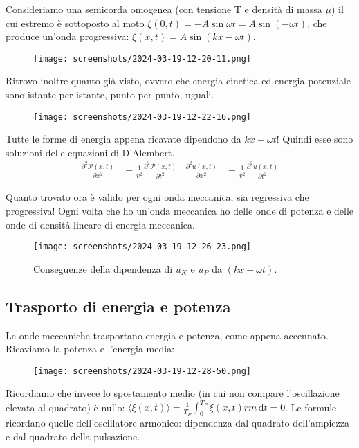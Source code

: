 \begin{eg}
	Consideriamo una semicorda omogenea (con tensione T e densità di massa \(\mu \)) il cui estremo è sottoposto al moto \(\xi (0,t) = -A \sin \omega t = A \sin (-\omega t)\), che produce un'onda progressiva: \(\xi (x,t) = A \sin (kx - \omega t)\).
	\begin{figure}[H]
		\centering
		\texttt{[image: screenshots/2024-03-19-12-20-11.png]}
	\end{figure}
	Ritrovo inoltre quanto già visto, ovvero che energia cinetica ed energia potenziale sono istante per istante, punto per punto, uguali.
	\begin{figure}[H]
		\centering
		\texttt{[image: screenshots/2024-03-19-12-22-16.png]}
	\end{figure}
	Tutte le forme di energia appena ricavate dipendono da \(kx-\omega t\)! Quindi esse sono soluzioni delle equazioni di D'Alembert.
	\begin{align}
		\frac{\partial ^{2} \mathcal{P} (x,t)}{\partial x^{2} } &= \frac{1}{v^{2} }\frac{\partial ^{2} \mathcal{P} (x,t)}{\partial t^{2} }
		&
		\frac{\partial ^{2} u (x,t)}{\partial x^{2} } &= \frac{1}{v^{2} }\frac{\partial ^{2} u(x,t)}{\partial t^{2} }  
	\end{align}
\end{eg}
Quanto trovato ora è valido per ogni onda meccanica, sia regressiva che progressiva! Ogni volta che ho un'onda meccanica ho delle onde di potenza e delle onde di densità lineare di energia meccanica.
\begin{figure}[H]
	\centering
	\texttt{[image: screenshots/2024-03-19-12-26-23.png]}
	\caption{Conseguenze della dipendenza di \(u_K\) e \(u_P\) da \((kx-\omega t)\).}
\end{figure}

\subsection{Trasporto di energia e potenza}
Le onde meccaniche trasportano energia e potenza, come appena accennato. Ricaviamo la potenza e l'energia media:
\begin{figure}[H]
	\centering
	\texttt{[image: screenshots/2024-03-19-12-28-50.png]}
\end{figure}
Ricordiamo che invece lo spostamento medio (in cui non compare l'oscillazione elevata al quadrato) è nullo: \(\langle \xi (x,t)\rangle  = \frac{1}{T_P} \int_{0}^{T_P} \xi (x,t)rm  \,\mathrm{d}t =0\).
Le formule ricordano quelle dell'oscillatore armonico: dipendenza dal quadrato dell'ampiezza e dal quadrato della pulsazione.
